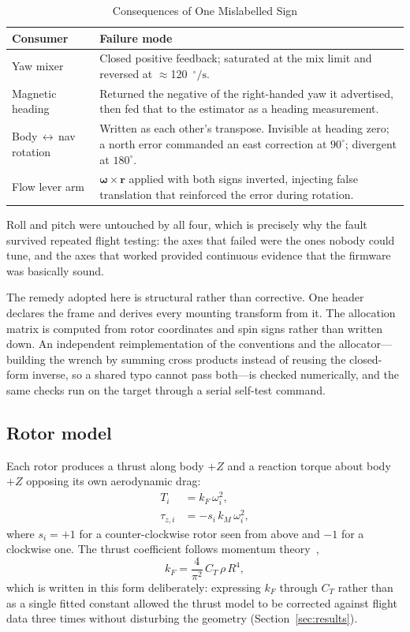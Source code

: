 \documentclass[conference]{IEEEtran}
\newcommand{\kF}{k_{F}}
\newcommand{\kM}{k_{M}}
\newcommand{\dps}{\ensuremath{^{\circ}\!/\mathrm{s}}}
\begin{document}
\begin{table}[!t]
\caption{Consequences of One Mislabelled Sign}
\label{tab:faults}
\centering
\footnotesize
\begin{tabular}{@{}p{}p{}@{}}
\toprule
Consumer & Failure mode \\
\midrule
Yaw mixer &
Closed positive feedback; saturated at the mix limit and reversed at
$\approx$120~\dps. \\[2pt]
Magnetic heading &
Returned the negative of the right-handed yaw it advertised, then fed that to
the estimator as a heading measurement. \\[2pt]
Body\,$\leftrightarrow$\,nav rotation &
Written as each other's transpose. Invisible at heading zero; a north error
commanded an east correction at $90^{\circ}$; divergent at $180^{\circ}$. \\[2pt]
Flow lever arm &
$\boldsymbol{\omega}\times\mathbf{r}$ applied with both signs inverted,
injecting false translation that reinforced the error during rotation. \\
\bottomrule
\end{tabular}
\end{table}

Roll and pitch were untouched by all four, which is precisely why the fault
survived repeated flight testing: the axes that failed were the ones nobody
could tune, and the axes that worked provided continuous evidence that the
firmware was basically sound.

The remedy adopted here is structural rather than corrective. One header
declares the frame and derives every mounting transform from it. The
allocation matrix is computed from rotor coordinates and spin signs rather
than written down. An independent reimplementation of the conventions and the
allocator---building the wrench by summing cross products instead of reusing
the closed-form inverse, so a shared typo cannot pass both---is checked
numerically, and the same checks run on the target through a serial
self-test command.

\subsection{Rotor model}

Each rotor produces a thrust along body $+Z$ and a reaction torque about body
$+Z$ opposing its own aerodynamic drag:
\begin{align}
T_i    &= \kF\,\omega_i^{2}, \\
\tau_{z,i} &= -s_i\,\kM\,\omega_i^{2},
\end{align}
where $s_i=+1$ for a counter-clockwise rotor seen from above and $-1$ for a
clockwise one. The thrust coefficient follows momentum
theory~\cite{leishman2006},
\begin{equation}
\kF = \frac{4}{\pi^{2}}\,C_T\,\rho\,R^{4},
\label{eq:kf}
\end{equation}
which is written in this form deliberately: expressing $\kF$ through $C_T$
rather than as a single fitted constant allowed the thrust model to be
corrected against flight data three times without disturbing the geometry
(Section~\ref{sec:results}).
\end{document}
